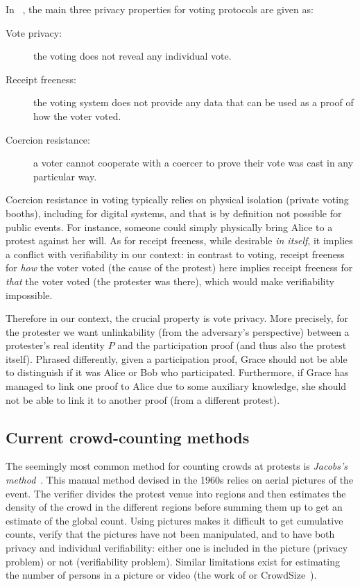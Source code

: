 In ~\cite{VerifyingPrivacyPropertiesOfVotingProtocols}, the main three
privacy properties for voting protocols are given as:
\begin{description}
  \item[Vote privacy:] the voting does not reveal any individual vote.
  \item[Receipt freeness:] the voting system does not provide any data that can be used as a proof of how the voter voted.
  \item[Coercion resistance:] a voter cannot cooperate with a coercer to prove their vote was cast in any particular way.
\end{description}

Coercion resistance in voting typically relies on physical isolation
(\eg private voting booths), including for digital systems, 
and that is by definition not possible for public events.
For instance, someone could simply physically bring Alice to a protest against her will.
As for receipt freeness, while
desirable \emph{in itself}, it implies a conflict with verifiability in our context:
in contrast to voting, receipt freeness for \emph{how} the voter voted (\ie the 
cause of the protest) here implies receipt freeness for \emph{that} the voter voted 
(\ie the protester was there), which would make verifiability impossible.

Therefore in our context, the crucial property is  vote privacy.
More precisely, for the protester we want unlinkability (from the adversary's 
perspective) between a protester's real identity \(P\) and the participation 
proof (and thus also the protest itself).
Phrased differently, given a participation proof, Grace should not be able to 
distinguish if it was Alice or Bob who participated.
Furthermore, if Grace has managed to link one proof to Alice due to some 
auxiliary knowledge, she should not be able to link it to another proof (from a different protest).

\subsection{Current crowd-counting methods}

The seemingly most common method for counting crowds at protests is \emph{Jacobs's method}~\cite{2016DemonstrationsInSeoul,BBCHowToCountProtestNumbers,HowWillWeKnowTrumpInauguralCrowdSize,TheXManMarch,TheCrowdNumbersGame}.
This manual method devised in the 1960s relies on aerial pictures of the event.
The verifier divides the protest venue into regions and then estimates the density of the crowd in the different regions before summing them up to get an estimate of the global count. Using pictures makes it difficult to get cumulative counts, verify that the pictures have not been manipulated, and to have both privacy and individual verifiability: either one is included in the picture (privacy problem) or not (verifiability problem). Similar limitations exist for estimating the number of persons in a picture or video (\eg the work of \cite{NNCrowdCounting} or  CrowdSize~\cite{CrowdSize}).

